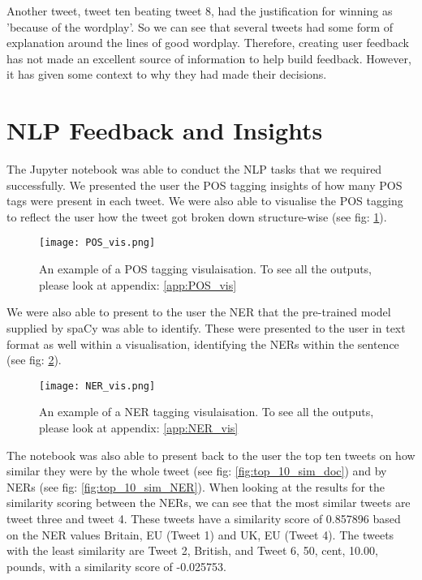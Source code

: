 	Another tweet, tweet ten beating tweet 8, had the justification for winning as 'because of the wordplay'. So we can see that several tweets had some form of explanation around the lines of good wordplay. Therefore, creating user feedback has not made an excellent source of information to help build feedback. However, it has given some context to why they had made their decisions.


\section{NLP Feedback and Insights}
\label{sec:reaults_NLP}
	
	The Jupyter notebook was able to conduct the NLP tasks that we required successfully. We presented the user the POS tagging insights of how many POS tags were present in each tweet. We were also able to visualise the POS tagging to reflect the user how the tweet got broken down structure-wise (see fig: \ref{fig:POS_example}).
	
	\begin{figure}[h]
		\centering
		\texttt{[image: POS\_vis.png]}
		\caption{An example of a POS tagging visulaisation. To see all the outputs, please look at appendix: \ref{app:POS_vis}}
		\label{fig:POS_example}
		
	\end{figure}

	We were also able to present to the user the NER that the pre-trained model supplied by spaCy was able to identify. These were presented to the user in text format as well within a visualisation, identifying the NERs within the sentence (see fig: \ref{fig:NER_example}).
	
	\begin{figure}[h]
		\centering
		\texttt{[image: NER\_vis.png]}
		\caption{An example of a NER tagging visulaisation. To see all the outputs, please look at appendix: \ref{app:NER_vis}}
		\label{fig:NER_example}
		
	\end{figure}

	The notebook was also able to present back to the user the top ten tweets on how similar they were by the whole tweet (see fig: \ref{fig:top_10_sim_doc}) and by NERs (see fig: \ref{fig:top_10_sim_NER}). When looking at the results for the similarity scoring between the NERs, we can see that the most similar tweets are tweet three and tweet 4. These tweets have a similarity score of 0.857896 based on the NER values Britain, EU (Tweet 1) and UK, EU (Tweet 4). The tweets with the least similarity are Tweet 2, British, and Tweet 6, 50, cent, 10.00, pounds, with a similarity score of -0.025753.
	 
